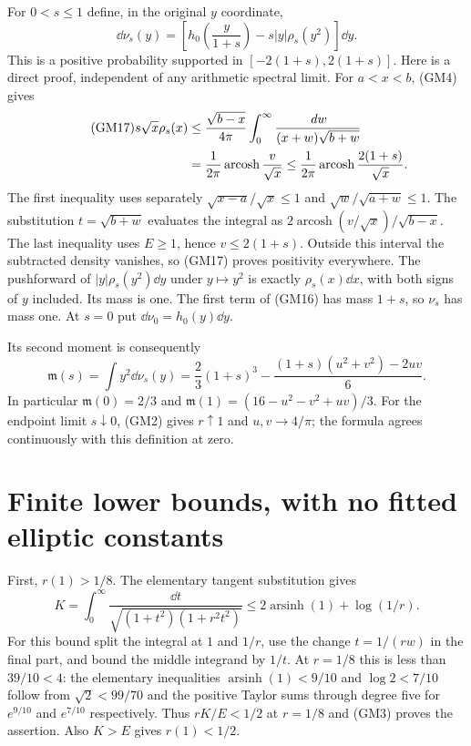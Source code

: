 \documentclass[11pt]{article}
\begin{document}
For $0<s\le1$ define, in the original $y$ coordinate,
\begin{equation}\tag{GM16}
 \dd\nu_s(y)=\left[h_0\left(\frac y{1+s}\right)
                    -s|y|\rho_s(y^2)\right]\dd y.
\end{equation}
This is a positive probability supported in $[-2(1+s),2(1+s)]$.
Here is a direct proof, independent of any arithmetic spectral limit.
For $a<x<b$, (GM4) gives
\begin{align}\tag{GM17}
 s\sqrt x\rho_s(x)
 &\le\frac{\sqrt{b-x}}{4\pi}
          \int_0^\infty\frac{\,d w}{(x+w)\sqrt{b+w}}\notag\\
 &=\frac1{2\pi}\operatorname{arcosh}\frac v{\sqrt x}
 \le\frac1{2\pi}\operatorname{arcosh}\frac{2(1+s)}{\sqrt x}.\notag
\end{align}
The first inequality uses separately $\sqrt{x-a}/\sqrt x\le1$ and
$\sqrt w/\sqrt{a+w}\le1$. The substitution $t=\sqrt{b+w}$ evaluates
the integral as
$2\operatorname{arcosh}(v/\sqrt x)/\sqrt{b-x}$.
The last inequality uses $E\ge1$, hence $v\le2(1+s)$.
Outside this interval the subtracted density vanishes, so (GM17)
proves positivity everywhere. The pushforward of
$|y|\rho_s(y^2)\dd y$ under $y\mapsto y^2$ is exactly
$\rho_s(x)\dd x$, with both signs of $y$ included. Its mass is one.
The first term of (GM16) has mass $1+s$, so $\nu_s$ has mass one.
At $s=0$ put $\dd\nu_0=h_0(y)\dd y$.

Its second moment is consequently
\begin{equation}\tag{GM18}
 \boxed{\mathfrak m(s)=\int y^2\dd\nu_s(y)
 =\frac23(1+s)^3-\frac{(1+s)(u^2+v^2)-2uv}{6}.}
\end{equation}
In particular $\mathfrak m(0)=2/3$ and
$\mathfrak m(1)=(16-u^2-v^2+uv)/3$.
For the endpoint limit $s\downarrow0$, (GM2) gives
$r\uparrow1$ and $u,v\to4/\pi$; the formula agrees continuously
with this definition at zero.

\section{Finite lower bounds, with no fitted elliptic constants}
First, $r(1)>1/8$. The elementary tangent substitution gives
\[
 K=\int_0^\infty\frac{\dd t}{\sqrt{(1+t^2)(1+r^2t^2)}}
 \le2\operatorname{arsinh}(1)+\log(1/r).
\]
For this bound split the integral at $1$ and $1/r$, use the change
$t=1/(rw)$ in the final part, and bound the middle integrand by $1/t$.
At $r=1/8$ this is less than $39/10<4$: the elementary inequalities
$\operatorname{arsinh}(1)<9/10$ and $\log2<7/10$ follow from
$\sqrt2<99/70$ and the positive Taylor sums through degree five for
$e^{9/10}$ and $e^{7/10}$ respectively.
Thus $rK/E<1/2$ at $r=1/8$ and (GM3) proves the assertion.
Also $K>E$ gives $r(1)<1/2$.
\end{document}
